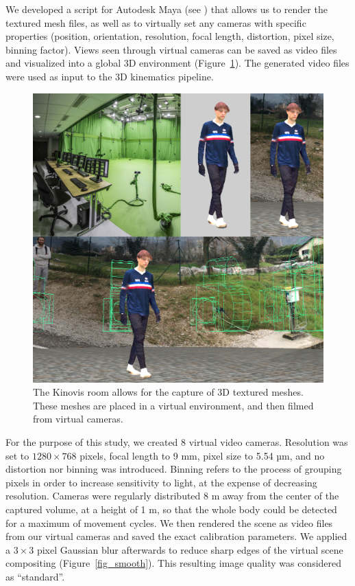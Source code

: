 We developed a script for Autodesk Maya \cite{Maya1998} (see ) that allows us to render the textured mesh files, as well as to virtually set any cameras with specific properties (position, orientation, resolution, focal length, distortion, pixel size, binning factor). Views seen through virtual cameras can be saved as video files and visualized into a global 3D environment (Figure~\ref{fig_kinovis}). The generated video files were used as input to the 3D kinematics pipeline.

\begin{figure}[!ht]
	\centering
	\def\svgwidth{1\columnwidth}
	\fontsize{10pt}{10pt}\selectfont
	\includegraphics[width=\linewidth]{"../Chap4/Figures/Fig_Kinovis.png"}
	\caption{The Kinovis room allows for the capture of 3D textured meshes. These meshes are placed in a virtual environment, and then filmed from virtual cameras.}
	\label{fig_kinovis}
\end{figure}

For the purpose of this study, we created 8 virtual video cameras. Resolution was set to \(1280 \times 768\) pixels, focal length to 9 mm, pixel size to 5.54 µm, and no distortion nor binning was introduced. Binning refers to the process of grouping pixels in order to increase sensitivity to light, at the expense of decreasing resolution. Cameras were regularly distributed 8 m away from the center of the captured volume, at a height of 1 m, so that the whole body could be detected for a maximum of movement cycles. We then rendered the scene as video files from our virtual cameras and saved the exact calibration parameters. We applied a \(3 \times 3\) pixel Gaussian blur afterwards to reduce sharp edges of the virtual scene compositing (Figure~\ref{fig_smooth}). This resulting image quality was considered as “standard”.

